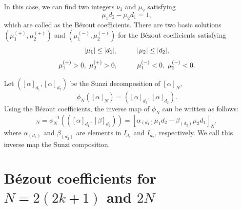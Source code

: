 \documentclass[12pt]{iopart}
\begin{document}
In this case, we can find two integers \(\nu_1\) and \(\mu_2\)
satisfying
\begin{equation}
\mu_1d_2-\mu_2d_1=1,
\end{equation}
which are called as the B\'ezout coefficients.
%
There are two basic solutions
\((\mu_1^{(+)},\mu_2^{(+)})\)
and
\((\mu_1^{(-)},\mu_2^{(-)})\)
for the B\'ezout coefficients satisfying
\begin{equation}
|\mu_1|\le|d_1|,
\hspace{10mm}
|\mu_2|\le|d_2|,
\end{equation}
\begin{equation}
\mu_1^{(+)}>0,\ \mu_2^{(+)}>0,
\hspace{10mm}
\mu_1^{(-)}<0,\ \mu_2^{(-)}<0.
\end{equation}

Let \(([\alpha]_{d_1},[\alpha]_{d_2})\) be the Sunzi decomposition of \([\alpha]_{N}\),
\begin{equation}
\phi_N([\alpha]_N)=([\alpha]_{d_1},[\alpha]_{d_2}).
\end{equation}
Using the B\'ezout coefficients, the inverse map of \(\phi_N\) can be
written as follows:
\begin{equation}
[\gamma]_{N}=\phi_N^{-1}(([\alpha]_{d_1},[\beta]_{d_2}))
=[\alpha_{(d_1)}\mu_1d_2-\beta_{(d_2)}\mu_2d_1]_N,
\end{equation}
where \(\alpha_{(d_1)}\) and \(\beta_{(d_2)}\) are
elements in \(I_{d_1}\) and \(I_{d_2}\), respectively.
We call this inverse map the Sunzi composition.

\newpage

\section{B\'ezout coefficients for \(N=2(2k+1)\) and \(2N\)}
\vspace{2mm}
\end{document}
